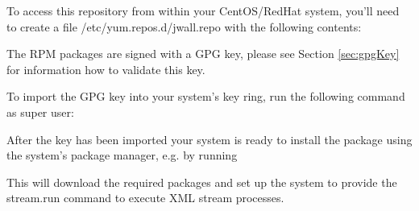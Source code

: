 To access this repository from within your CentOS/RedHat system,
you'll need to create a file {\ttfamily /etc/yum.repos.d/jwall.repo}
with the following contents:

\hspace{4ex}

The RPM packages are signed with a GPG key, please see Section
\ref{sec:gpgKey} for information how to validate this key.

To import the GPG key into your system's key ring, run the
following command as super user:

\hspace{4ex}

After the key has been imported your system is ready to install
the \streams package using the system's package manager, e.g.
by running

\hspace{4ex}

This will download the required packages and set up the system
to provide the {\ttfamily stream.run} command to execute XML
stream processes.